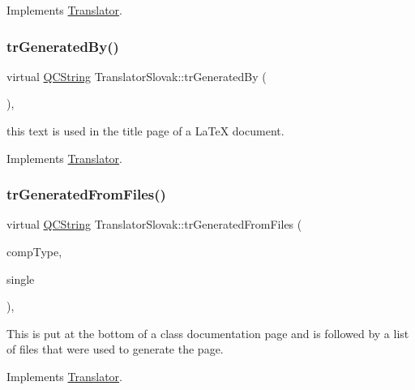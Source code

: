 Implements \mbox{\hyperlink{class_translator}{Translator}}.

\mbox{\label{class_translator_slovak_a28509ef0139e6ee049abc299910abe23}} 
\subsubsection{\texorpdfstring{trGeneratedBy()}{trGeneratedBy()}}
{\footnotesize\ttfamily virtual \mbox{\hyperlink{class_q_c_string}{Q\+C\+String}} Translator\+Slovak\+::tr\+Generated\+By (\begin{DoxyParamCaption}{ }\end{DoxyParamCaption})\hspace{0.3cm}{\ttfamily [inline]}, {\ttfamily [virtual]}}

this text is used in the title page of a La\+TeX document. 

Implements \mbox{\hyperlink{class_translator}{Translator}}.

\mbox{\label{class_translator_slovak_a5e74bb43261cec90fa362064a3cdbb76}} 
\subsubsection{\texorpdfstring{trGeneratedFromFiles()}{trGeneratedFromFiles()}}
{\footnotesize\ttfamily virtual \mbox{\hyperlink{class_q_c_string}{Q\+C\+String}} Translator\+Slovak\+::tr\+Generated\+From\+Files (\begin{DoxyParamCaption}\item[{\mbox{\hyperlink{class_class_def_ae70cf86d35fe954a94c566fbcfc87939}{Class\+Def\+::\+Compound\+Type}}}]{comp\+Type,  }\item[{bool}]{single }\end{DoxyParamCaption})\hspace{0.3cm}{\ttfamily [inline]}, {\ttfamily [virtual]}}

This is put at the bottom of a class documentation page and is followed by a list of files that were used to generate the page. 

Implements \mbox{\hyperlink{class_translator}{Translator}}.

